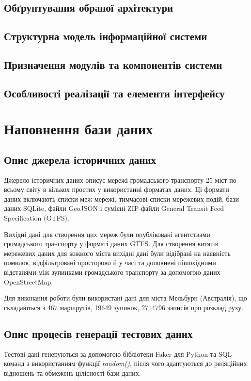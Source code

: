 \documentclass[oneside,14pt]{extarticle}
\begin{document}
\subsection{Обґрунтування обраної архітектури}
\subsection{Структурна модель інформаційної системи}
\subsection{Призначення модулів та компонентів системи}
\subsection{Особливості реалізації та елементи інтерфейсу}
\newpage

\section{Наповнення бази даних}
\subsection{Опис джерела історичних даних}
Джерело історичних даних описує мережі громадського транспорту 25 міст по всьому світу в кількох простих у використанні форматах даних. Ці формати даних включають списки меж мережі, тимчасові списки мережевих подій, бази даних SQLite, файли GeoJSON і сумісні ZIP-файли General Transit Feed Specification (GTFS).

Вихідні дані для створення цих мереж були опубліковані агентствами громадського транспорту у форматі даних GTFS. Для створення витягів мережевих даних для кожного міста вихідні дані були відібрані на наявність помилок, відфільтровані просторово й у часі та доповнені пішохідними відстанями між зупинками громадського транспорту за допомогою даних OpenStreetMap.

Для виконання роботи були використані дані для міста Мельбурн (Австралія), що складаються з 467 маршрутів, 19649 зупинок, 2714796 записів про розклад руху.

\subsection{Опис процесів генерації тестових даних}
Тестові дані генеруються за допомогою бібліотеки Faker для Python та SQL команд з використанням функції \textit{random()}, після чого адаптуються до реляційних відношень та обмежень цілісності бази даних. 
\end{document}
